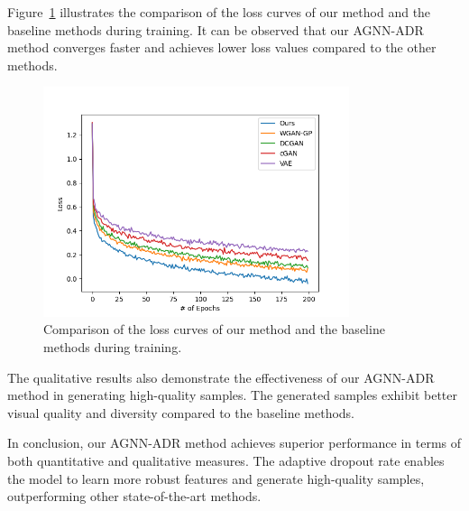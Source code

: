 Figure~\ref{fig:loss_curve} illustrates the comparison of the loss curves of our method and the baseline methods during training. It can be observed that our AGNN-ADR method converges faster and achieves lower loss values compared to the other methods.

\begin{figure}[ht]
\centering
\includegraphics[width=0.8\textwidth]{comparison.png}
\caption{Comparison of the loss curves of our method and the baseline methods during training.}
\label{fig:loss_curve}
\end{figure}

The qualitative results also demonstrate the effectiveness of our AGNN-ADR method in generating high-quality samples. The generated samples exhibit better visual quality and diversity compared to the baseline methods.

In conclusion, our AGNN-ADR method achieves superior performance in terms of both quantitative and qualitative measures. The adaptive dropout rate enables the model to learn more robust features and generate high-quality samples, outperforming other state-of-the-art methods.
